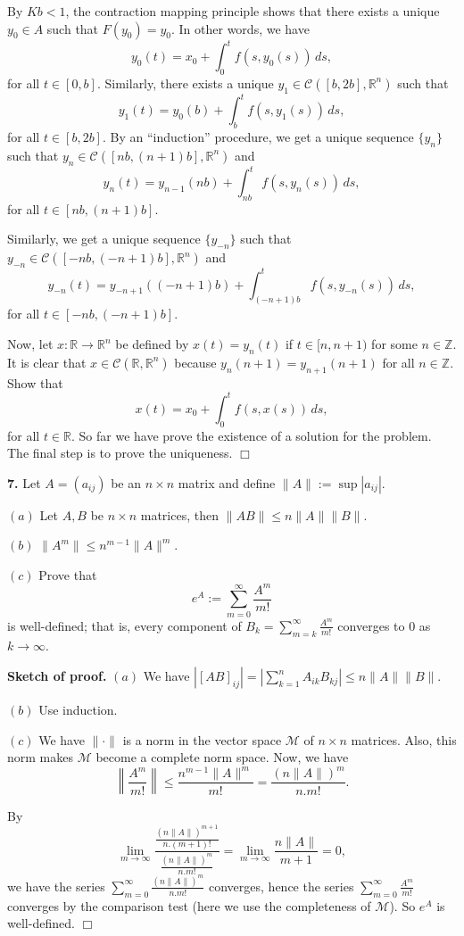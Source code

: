 \documentclass{article}
\begin{document}
By $Kb < 1$, the contraction mapping principle shows that there exists a
unique $y_0 \in A$ such that $F(y_0) = y_0$. In other words, we have
\[ y_0(t) = x_0 + \int_0^t f(s, y_0(s))\, ds,\] for all $t\in [0,b]$.
Similarly, there exists a unique
$y_1\in \mathcal{C}([b,2b],\mathbb{R}^n)$ such that
\[ y_1(t) = y_0(b) + \int_b^t f(s,y_1(s))\,ds ,\] for all
$t \in [b,2b]$. By an ``induction'' procedure, we get a unique sequence
$\{y_n\}$ such that $y_n \in \mathcal{C}([nb,(n+1)b],\mathbb{R}^n)$ and
\[y_n(t) = y_{n-1}(nb) + \int_{nb}^t f(s,y_n(s))\,ds ,\] for all
$t \in [nb,(n+1)b]$.

Similarly, we get a unique sequence $\{y_{-n}\}$ such that
$y_{-n} \in \mathcal{C}([-nb, (-n+1)b],\mathbb{R}^n)$ and
\[y_{-n}(t) = y_{-n+1}((-n+1)b) + \int_{(-n+1)b}^t f(s,y_{-n}(s))\,ds,\]
for all $t \in [-nb, (-n+1)b]$.

Now, let $x:\mathbb{R}\to \mathbb{R}^n$ be defined by $x(t) = y_n(t)$ if
$t \in [n, n+1)$ for some $n\in \mathbb{Z}$. It is clear that
$x \in \mathcal{C}(\mathbb{R},\mathbb{R}^n)$ because
$y_n(n+1) = y_{n+1}(n+1)$ for all $n\in \mathbb{Z}$. Show that
\[x(t) = x_0 + \int_0^t f(s, x(s))\,ds,\] for all $t\in \mathbb{R}$. So
far we have prove the existence of a solution for the problem. The final
step is to prove the uniqueness. $\Box$

    \textbf{7.} Let $A = (a_{ij})$ be an $n \times n$ matrix and define
$\|A\| := \sup |a_{ij} |$.

$(a)$ Let $A, B$ be $n \times n$ matrices, then
$\|AB \|≤ n\| A\| \|B\|$.

$(b)$ $\|A^m\| ≤ n^{m−1}\| A\|^m$.

$(c)$ Prove that \[e^{A} := \sum_{m=0}^{\infty}\frac{A^m}{m!}\] is
well-defined; that is, every component of
$B_k =\sum_{m=k}^{\infty}\frac{A^m}{m!}$ converges to $0$ as
$k \to \infty$.

    \textbf{Sketch of proof.} $(a)$ We have
$|[AB]_{ij}| = |\sum_{k=1}^n A_{ik}B_{kj}| \le n \|A\| \|B\|$.

$(b)$ Use induction.

$(c)$ We have $\|\cdot \|$ is a norm in the vector space $\mathcal{M}$
of $n\times n$ matrices. Also, this norm makes $\mathcal{M}$ become a
complete norm space. Now, we have
\[\left\|\frac{A^m}{m!}\right\| \le  \frac{n^{m-1} \|A\|^m}{m!}= \frac{(n\|A\|)^m}{n.m!}.\]

By
\[\lim_{m\to \infty} \frac{\frac{(n\|A\|)^{m+1}}{n.(m+1)!}}{\frac{(n\|A\|)^m}{n.m!}} = \lim_{m\to\infty} \frac{n\|A\|}{m+1} = 0,\]
we have the series $\sum_{m=0}^{\infty}\frac{(n\|A\|)^m}{n.m!}$
converges, hence the series $\sum_{m=0}^{\infty}\frac{A^m}{m!}$
converges by the comparison test (here we use the completeness of
$\mathcal{M}$). So $e^A$ is well-defined. $\Box$
\end{document}
